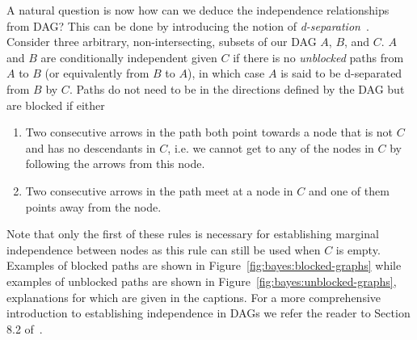 A natural question is now how can we deduce the independence relationships from DAG?
This can be done by introducing the notion of \emph{d-separation}~\citep{pearl2014probabilistic}.
Consider three arbitrary, non-intersecting, subsets of our DAG $A$, $B$, and $C$.  $A$ and $B$
are conditionally independent given $C$ if there is no \emph{unblocked} paths from $A$ to $B$
(or equivalently from $B$ to $A$), in which case $A$ is said to be d-separated from $B$ by $C$.  
Paths do not need to be in the directions defined by the DAG but are blocked if either
\begin{enumerate}
	\item Two consecutive arrows in the path both point towards a node that is not $C$ and
	has no descendants in $C$, i.e. we cannot get to any of the nodes in $C$ by following the arrows
	from this node.
	\item Two consecutive arrows in the path meet at a node in $C$ and one of them
	points away from the node.
\end{enumerate}
Note that only the first of these rules is necessary for establishing marginal independence
between nodes as this rule can still be used when $C$ is empty.
Examples of blocked paths are shown in Figure~\ref{fig:bayes:blocked-graphs} while examples of unblocked paths
are shown in Figure~\ref{fig:bayes:unblocked-graphs}, explanations for which are given in the captions.
For a more comprehensive introduction to establishing independence in DAGs we
refer the reader to Section 8.2 of~\cite{bishop2006pattern}.

